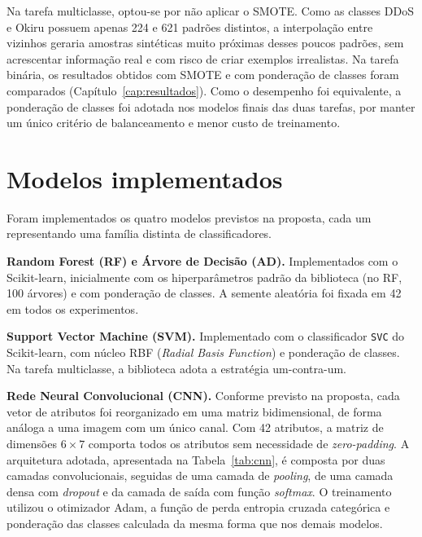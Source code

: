 Na tarefa multiclasse, optou-se por não aplicar o SMOTE. Como as classes DDoS e Okiru possuem apenas 224 e 621 padrões distintos, a interpolação entre vizinhos geraria amostras sintéticas muito próximas desses poucos padrões, sem acrescentar informação real e com risco de criar exemplos irrealistas. Na tarefa binária, os resultados obtidos com SMOTE e com ponderação de classes foram comparados (Capítulo~\ref{cap:resultados}). Como o desempenho foi equivalente, a ponderação de classes foi adotada nos modelos finais das duas tarefas, por manter um único critério de balanceamento e menor custo de treinamento.

\section{Modelos implementados}
\label{sec:modelos}

Foram implementados os quatro modelos previstos na proposta, cada um representando uma família distinta de classificadores.

\textbf{Random Forest (RF) e Árvore de Decisão (AD).} Implementados com o Scikit-learn, inicialmente com os hiperparâmetros padrão da biblioteca (no RF, 100 árvores) e com ponderação de classes. A semente aleatória foi fixada em 42 em todos os experimentos.

\textbf{Support Vector Machine (SVM).} Implementado com o classificador \texttt{SVC} do Scikit-learn, com núcleo RBF (\textit{Radial Basis Function}) e ponderação de classes. Na tarefa multiclasse, a biblioteca adota a estratégia um-contra-um.

\textbf{Rede Neural Convolucional (CNN).} Conforme previsto na proposta, cada vetor de atributos foi reorganizado em uma matriz bidimensional, de forma análoga a uma imagem com um único canal. Com 42 atributos, a matriz de dimensões $6 \times 7$ comporta todos os atributos sem necessidade de \textit{zero-padding}. A arquitetura adotada, apresentada na Tabela~\ref{tab:cnn}, é composta por duas camadas convolucionais, seguidas de uma camada de \textit{pooling}, de uma camada densa com \textit{dropout} e da camada de saída com função \textit{softmax}. O treinamento utilizou o otimizador Adam, a função de perda entropia cruzada categórica e ponderação das classes calculada da mesma forma que nos demais modelos.

